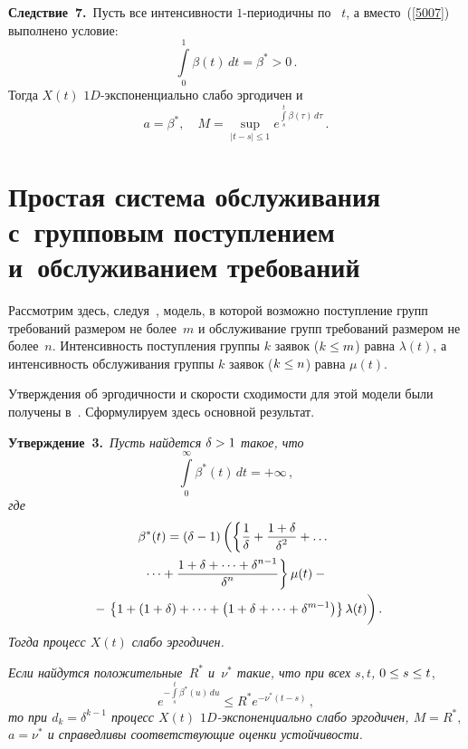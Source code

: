 \begin{multicols}{2}
\medskip

\noindent
\textbf{Следствие~7.}\
Пусть все интенсивности $1$-пе\-ри\-о\-дич\-ны по~ $t$, а вместо~(\ref{5007})
выполнено условие:
\begin{equation*}
\int\limits_0^{1}\beta\left( t\right)\, dt = \beta^* > 0\,.
\end{equation*}
Тогда  $X(t)$  $1D$-экс\-по\-нен\-ци\-аль\-но слабо эргодичен и
\begin{equation*}
a= \beta^*, \quad M = \sup\limits_{|t-s|\le 1}
e^{\int\limits_s^{t}\beta\left( \tau\right)\, d\tau}\,.
\end{equation*}


\section{Простая система обслуживания с~групповым поступлением и~обслуживанием требований}

Рассмотрим здесь, следуя~\cite{z12b}, модель, в которой
возможно поступление групп требований размером не более~$m$
и обслуживание групп требований размером не более~$n$.
Интенсивность поступления группы  $k$ заявок  ($k \hm\le m$) равна $\lambda(t)$,
а интенсивность обслуживания
группы  $k$ заявок ($k \hm\le n$) равна $\mu(t)$.

\smallskip
Утверждения об эргодичности и скорости сходимости для этой модели были получены
в~\cite{z12b}. Сформулируем здесь основной результат.

\medskip

\noindent
\textbf{Утверждение~3.}\
\textit{Пусть найдется  $\delta \hm> 1$ такое, что}
\begin{equation}
 \int\limits_{0}^{\infty} \beta^*(t) \, dt = + \infty\,,
\label{5021}
\end{equation}
\textit{где}
\begin{multline*}
\beta^*(t) =  \left( \delta-1\right)\left(\left\{\fr{1}{\delta} + \fr{1+\delta}{\delta^2}
+ \dots{}\right.\right.\\
\left.{}\dots +\fr{1+\delta+\dots+\delta^{n-1}}{\delta^n}\right\}\mu(t) -{} \\
{} - \left. \left\{1 + \left(1+\delta\right)+\dots+\left(1+\delta+\dots+\delta^{m-1}\right)
\right\}\la(t) 
\vphantom{\fr{1}{\delta}}\right).\hspace*{-3.29407pt}
\end{multline*}
\textit{Тогда процесс $X\left( t\right) $ слабо эргодичен.}

\textit{Если найдутся положительные~$R^*$ и~$\nu^*$ такие, что при всех  $s,t$,
$0 \hm\le s \hm\le t$},
\begin{equation*}
  e^{-\int\limits_s^t \beta^*(u)\, du} \le R^* e^{-\nu^* (t-s)}\,,
\end{equation*}
\textit{то при  $d_k={\delta}^{k-1}$ процесс $X(t)$ $1D$-экспоненциально слабо эргодичен, $M=R^*,$ $a = \nu^*$ и справедливы соответствующие оценки устойчивости.}


\end{multicols}
